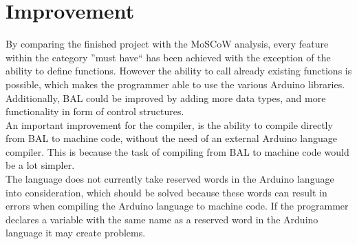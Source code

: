 \section{Improvement}\label{discussion:improvements}
By comparing the finished project with the MoSCoW analysis, every feature within the category ''must have`` has been achieved with the exception of the ability to define functions. However the ability to call already existing functions is possible, which makes the programmer able to use the various Arduino libraries. Additionally, BAL could be improved by adding more data types, and more functionality in form of control structures. \\

An important improvement for the compiler, is the ability to compile directly from BAL to machine code, without the need of an external Arduino language compiler. This is because the task of compiling from BAL to machine code would be a lot simpler.\\

The language does not currently take reserved words in the Arduino language into consideration, which should be solved because these words can result in errors when compiling the Arduino language to machine code. If the programmer declares a variable with the same name as a reserved word in the Arduino language it may create problems. \\ 